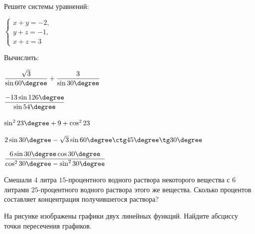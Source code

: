 \begin{listofex}
	\item Решите системы уравнений:
	\begin{enumcols}[itemcolumns=3]
		\item {}
		\item {}
		\item \( \left\{
		\begin{array}{l}
			x+y=-2,\\
			y+z=-1,\\
			x+z=3
		\end{array}
		\right. \)
	\end{enumcols}
	\item Вычислить:
	\begin{enumcols}[itemcolumns=2]
		\item \( \dfrac{\sqrt{3}}{\sin60\degree}+\dfrac{3}{\sin30\degree} \)
		\item \( \dfrac{-13\sin126\degree}{\sin54\degree} \)
		\item \( \sin^223\degree+9+\cos^223 \)
		\item \( 2\sin30\degree-\sqrt{3}\sin60\degree\ctg45\degree\tg30\degree\)
		\item \( \dfrac{6\sin30\degree\cos30\degree}{\cos^230\degree-\sin^230\degree} \)
	\end{enumcols}
	\item {}
	\item {}
	\item {}
	\item {}
	\item {}
	\item Смешали \( 4 \) литра \( 15 \)-процентного водного раствора некоторого вещества с \( 6 \) литрами	\( 25 \)-процентного водного раствора этого же вещества. Сколько процентов составляет концентрация получившегося раствора?
	\item
	\begin{minipage}[t]{0.67\textwidth}
		На рисунке изображены графики двух линейных функций. Найдите абсциссу точки пересечения графиков.
	\end{minipage}
	\begin{minipage}[c]{0.2\textwidth}

\end{minipage}
\end{listofex}
